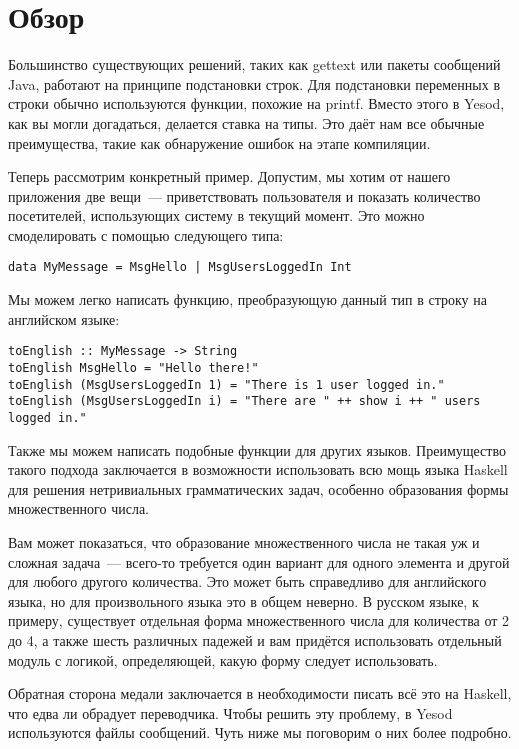 \section{Обзор}

Большинство существующих решений, таких как gettext или пакеты сообщений Java,
работают на принципе подстановки строк. Для подстановки переменных в строки
обычно используются функции, похожие на printf. Вместо этого в Yesod, как вы
могли догадаться, делается ставка на типы. Это даёт нам все обычные
преимущества, такие как обнаружение ошибок на этапе компиляции.

Теперь рассмотрим конкретный пример. Допустим, мы хотим от нашего приложения
две вещи~--- приветствовать пользователя и показать количество посетителей,
использующих систему в текущий момент. Это можно смоделировать с помощью
следующего типа:

\begin{lstlisting}
data MyMessage = MsgHello | MsgUsersLoggedIn Int
\end{lstlisting}

Мы можем легко написать функцию, преобразующую данный тип в строку на
английском языке:

\begin{lstlisting}
toEnglish :: MyMessage -> String
toEnglish MsgHello = "Hello there!"
toEnglish (MsgUsersLoggedIn 1) = "There is 1 user logged in."
toEnglish (MsgUsersLoggedIn i) = "There are " ++ show i ++ " users logged in."
\end{lstlisting}

Также мы можем написать подобные функции для других языков. Преимущество такого
подхода заключается в возможности использовать всю мощь языка Haskell для
решения нетривиальных грамматических задач, особенно образования формы
множественного числа.

\begin{remark}
    Вам может показаться, что образование множественного числа не такая уж и
    сложная задача~--- всего-то требуется один вариант для одного элемента и
    другой для любого другого количества. Это может быть справедливо для
    английского языка, но для произвольного языка это в общем неверно. В
    русском языке, к примеру, существует отдельная форма множественного числа
    для количества от 2 до 4, а также шесть различных падежей и вам придётся
    использовать отдельный модуль с логикой, определяющей, какую форму следует
    использовать.
\end{remark}

Обратная сторона медали заключается в необходимости писать всё это на Haskell,
что едва ли обрадует переводчика. Чтобы решить эту проблему, в Yesod
используются файлы сообщений. Чуть ниже мы поговорим о них более подробно.

